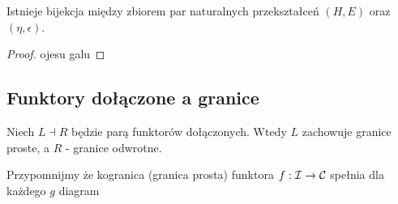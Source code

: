 \begin{theorem}{}{}
  Istnieje bijekcja między zbiorem par naturalnych przekształceń $(H, E)$ oraz $(\eta, \epsilon)$.
\end{theorem}

\begin{proof}
ojesu galu
\end{proof}

\subsection{Funktory dołączone a granice}

\begin{theorem}{}{}
  Niech $L\dashv R$ będzie parą funktorów dołączonych. Wtedy $L$ zachowuje granice proste, a $R$ - granice odwrotne.
\end{theorem}

Przypomnijmy że kogranica (granica prosta) funktora $f:\mathcal{I}\to\mathcal{C}$ spełnia dla każdego $g$ diagram
\begin{center}
\end{center}

